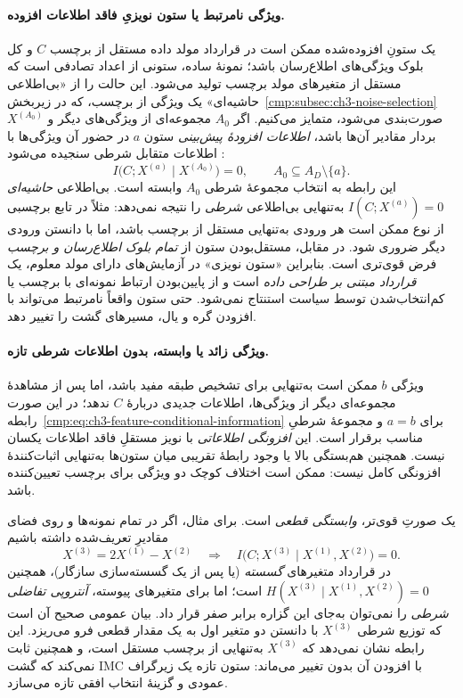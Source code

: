 \paragraph{ویژگی نامرتبط یا ستون نویزیِ فاقد اطلاعات افزوده.}
یک ستونِ افزوده‌شده ممکن است در قرارداد
مولد داده مستقل از برچسب $C$ و کل بلوک
ویژگی‌های اطلاع‌رسان باشد؛ نمونهٔ ساده،
ستونی از اعداد تصادفی است که مستقل از
متغیرهای مولد برچسب تولید می‌شود.
این حالت را از «بی‌اطلاعی حاشیه‌ای»
یک ویژگی از برچسب، که در
زیربخش~\ref{cmp:subsec:ch3-noise-selection}
صورت‌بندی می‌شود، متمایز می‌کنیم. اگر $A_0$ مجموعه‌ای از
ویژگی‌های دیگر و $X^{(A_0)}$ بردار مقادیر
آن‌ها باشد، \emph{اطلاعات افزودهٔ پیش‌بینی}
ستون $a$ در حضور آن ویژگی‌ها با
اطلاعات متقابل شرطی سنجیده می‌شود
\cite{CoverThomas2006}:
\begin{equation}\label{cmp:eq:ch3-feature-conditional-information}
I\bigl(C;X^{(a)}\mid X^{(A_0)}\bigr)=0,
\qquad A_0\subseteq A_D\setminus\{a\}.
\end{equation}
این رابطه به انتخاب مجموعهٔ شرطی $A_0$
وابسته است. بی‌اطلاعی \emph{حاشیه‌ای}
$I(C;X^{(a)})=0$ به‌تنهایی
بی‌اطلاعی \emph{شرطی} را نتیجه نمی‌دهد:
مثلاً در تابع برچسبی از نوع
 ممکن است هر ورودی به‌تنهایی
مستقل از برچسب باشد، اما با دانستن
ورودی دیگر ضروری شود.
در مقابل، مستقل‌بودن ستون از
\emph{تمام بلوک اطلاع‌رسان و برچسب}
فرض قوی‌تری است.
بنابراین «ستون نویزی» در آزمایش‌های
دارای مولد معلوم، یک
\emph{قرارداد مبتنی بر طراحی داده} است
و از پایین‌بودن ارتباط نمونه‌ای با برچسب
یا کم‌انتخاب‌شدن توسط سیاست استنتاج نمی‌شود.
حتی ستون واقعاً نامرتبط می‌تواند
با افزودن گره و یال، مسیرهای گشت را تغییر دهد.

\paragraph{ویژگی زائد یا وابسته، بدون اطلاعات شرطی تازه.}
ویژگی $b$ ممکن است به‌تنهایی برای
تشخیص طبقه مفید باشد، اما پس از مشاهدهٔ
مجموعه‌ای دیگر از ویژگی‌ها، اطلاعات
جدیدی دربارهٔ $C$ ندهد؛ در این صورت
رابطه~\eqref{cmp:eq:ch3-feature-conditional-information}
برای $a=b$ و مجموعهٔ شرطیِ مناسب
برقرار است. این \emph{افزونگی اطلاعاتی}
با نویز مستقلِ فاقد اطلاعات یکسان نیست.
همچنین هم‌بستگی بالا یا وجود رابطهٔ
تقریبی میان ستون‌ها به‌تنهایی
اثبات‌کنندهٔ افزونگی کامل نیست:
ممکن است اختلاف کوچک دو ویژگی برای
برچسب تعیین‌کننده باشد.

یک صورتِ قوی‌تر، \emph{وابستگی قطعی} است.
برای مثال، اگر در تمام نمونه‌ها و
روی فضای مقادیرِ تعریف‌شده داشته باشیم
\begin{equation}\label{cmp:eq:ch3-feature-deterministic-redundancy}
\boxed{
X^{(3)}=2X^{(1)}-X^{(2)}
\quad\Longrightarrow\quad
I\bigl(C;X^{(3)}\mid X^{(1)},X^{(2)}\bigr)=0.
}
\end{equation}
در قرارداد متغیرهای \emph{گسسته}
(یا پس از یک گسسته‌سازی سازگار)،
همچنین
$H(X^{(3)}\mid X^{(1)},X^{(2)})=0$
است؛ اما برای متغیرهای پیوسته،
\emph{آنتروپی تفاضلی شرطی} را نمی‌توان
به‌جای این گزاره برابر صفر قرار داد.
بیان عمومی صحیح آن است که توزیع شرطی
$X^{(3)}$ با دانستن دو متغیر اول
به یک مقدار قطعی فرو می‌ریزد.
این رابطه نشان نمی‌دهد که
$X^{(3)}$ به‌تنهایی از برچسب مستقل است،
و همچنین ثابت نمی‌کند که گشت IMC
با افزودن آن بدون تغییر می‌ماند:
ستون تازه یک زیرگراف عمودی و
گزینهٔ انتخاب افقی تازه می‌سازد.

